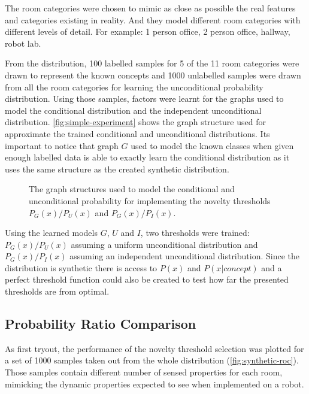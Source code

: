 The room categories were chosen to mimic as close as possible the real features and
categories existing in reality. And they model different room categories with
different levels of detail. For example: 1 person office, 2 person office, hallway,
robot lab.

From the distribution, 100 labelled samples for 5 of the 11 room categories were
drawn to represent the known concepts and 1000 unlabelled samples were drawn from
all the room categories for learning the unconditional probability distribution.
Using those samples, factors were learnt for the graphs used to model the
conditional distribution and the independent unconditional distribution.
\autoref{fig:simple-experiment} shows the graph structure used for approximate the
trained conditional and unconditional distributions.
Its important to notice that graph $G$ used to model the known classes when given
enough labelled data is able to exactly learn the conditional distribution as it
uses the same structure as the created synthetic distribution.

\begin{figure}[h]
\centering

\qquad
{}
\qquad
{}

\caption{\label{fig:simple-experiment}The graph structures used to model the
         conditional and unconditional probability for implementing the novelty
         thresholds $P_G(x)/P_U(x)$ and $P_G(x)/P_I(x)$.}
\end{figure}

Using the learned models $G$, $U$ and $I$, two thresholds were trained:
$P_G(x)/P_U(x)$ assuming a uniform unconditional distribution
and $P_G(x)/P_I(x)$ assuming an independent unconditional distribution.
Since the distribution is synthetic there is access to $P(x)$ and $P(x|concept)$
and a perfect threshold function could also be created to test how far the
presented thresholds are from optimal.

\subsection{Probability Ratio Comparison}
As first tryout, the performance of the novelty threshold selection was plotted for a set
of 1000 samples taken out from the whole distribution (\autoref{fig:synthetic-roc}).
Those samples contain different number of sensed properties for each room, mimicking
the dynamic properties expected to see when implemented on a robot.

